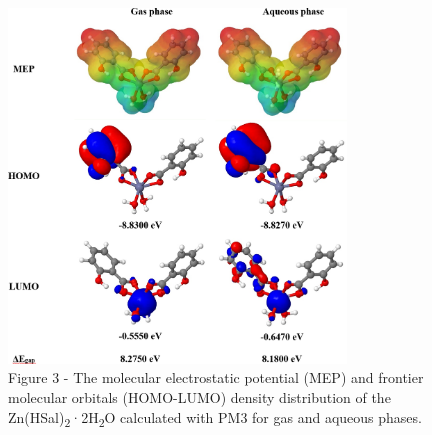 \begin{figure}[H]
	\centering
	\includegraphics[width=0.8\textwidth]{assets/41}
	\caption*{Figure 3 - The molecular electrostatic potential (MEP) and frontier molecular orbitals (HOMO-LUMO) density distribution of the Zn(HSal)\textsubscript{2}·2H\textsubscript{2}O calculated with PM3 for gas and aqueous phases.}
\end{figure}

